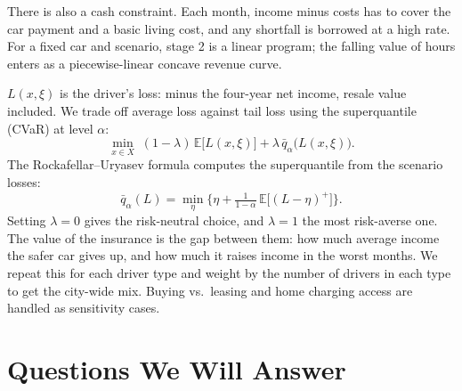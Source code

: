 \documentclass[11pt]{article}
\begin{document}
There is also a cash constraint. Each month, income minus costs has to cover the car payment and a basic living cost, and any shortfall is borrowed at a high rate. For a fixed car and scenario, stage 2 is a linear program; the falling value of hours enters as a piecewise-linear concave revenue curve.

$L(x,\xi)$ is the driver's loss: minus the four-year net income, resale value included. We trade off average loss against tail loss using the superquantile (CVaR) at level $\alpha$:
\begin{equation}
\min_{x \in X}\; (1-\lambda)\,\mathbb{E}\big[L(x,\xi)\big] + \lambda\,\bar q_\alpha\big(L(x,\xi)\big).
\end{equation}
The Rockafellar--Uryasev formula computes the superquantile from the scenario losses:
\begin{equation}
\bar q_\alpha(L) = \min_{\eta}\Big\{\eta + \tfrac{1}{1-\alpha}\,\mathbb{E}\big[(L-\eta)^+\big]\Big\}.
\end{equation}
Setting $\lambda = 0$ gives the risk-neutral choice, and $\lambda = 1$ the most risk-averse one. The value of the insurance is the gap between them: how much average income the safer car gives up, and how much it raises income in the worst months. We repeat this for each driver type and weight by the number of drivers in each type to get the city-wide mix. Buying vs.\ leasing and home charging access are handled as sensitivity cases.

\section{Questions We Will Answer}
\end{document}
